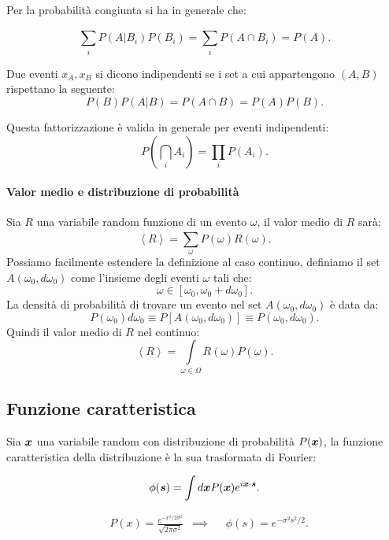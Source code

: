 Per la probabilità congiunta si ha in generale che:
\begin{greenbox}{}
	\[
    		\sum_{i}^{} P\left(A|B_i\right)P(B_i) = \sum_{i}^{} P\left(A \cap B_i\right) = P(A) 
	.\]    
\end{greenbox}
\begin{defn}
 Due eventi $x_A, x_B$ si dicono indipendenti se i set a cui appartengono $(A, B)$ rispettano la seguente:
\[
    P(B) P(A|B) = P(A\cap B) = P(A) P(B) 
.\]    
\end{defn}
\noindent
Questa fattorizzazione è valida in generale per eventi indipendenti:
\[
    P\left(\bigcap_i A_i\right) = \prod_i P(A_i) 
.\]    
\paragraph{Valor medio e distribuzione di probabilità}%
\label{par:Valor medio e distribuzione di probabilità}
Sia $R$ una variabile random funzione di un evento $\omega$, il valor medio di $R$ sarà:
 \[
    \left<R\right> = \sum_{\omega}^{} P(\omega) R(\omega) 
.\]    
Possiamo facilmente estendere la definizione al caso continuo, definiamo il set $A(\omega_0, d\omega_0)$ come l'insieme degli eventi $\omega$ tali che:
\[
    \omega  \in \left[\omega_0, \omega_0 + d\omega_0\right]
.\] 
La densità di probabilità di trovare un evento nel set $A(\omega_0, d\omega_0)$ è data da:
\[
    P(\omega_0) d\omega_0 \equiv P\left[A(\omega_0,d\omega_0) \right] \equiv P(\omega_0,d\omega_0) 
.\] 
Quindi il valor medio di $R$ nel continuo:
 \[
    \left<R\right> = \int\limits_{\omega\in \Omega} R(\omega) P(\omega) 
.\]    
\subsection{Funzione caratteristica}%
\label{sub:Funzione caratteristica}
Sia $\boldsymbol{x}$ una variabile random con distribuzione di probabilità $P(\boldsymbol{x})$, la funzione caratteristica della distribuzione è la sua trasformata di Fourier:
\begin{redbox}{}
    \[
	\phi (\boldsymbol{s}) = \int d\boldsymbol{x} P(\boldsymbol{x}) e^{i \boldsymbol{x}\cdot \boldsymbol{s}}
    .\] 
\end{redbox}

\begin{exmp}
 \[\begin{aligned}
    &P(x) = \frac{e^{-x^2 / 2 \sigma^2}}{\sqrt{2\pi\sigma^2}} 
    &\implies&
    &\phi (s) = e^{-\sigma^2s^2 / 2}
.\end{aligned}\]
\end{exmp}

